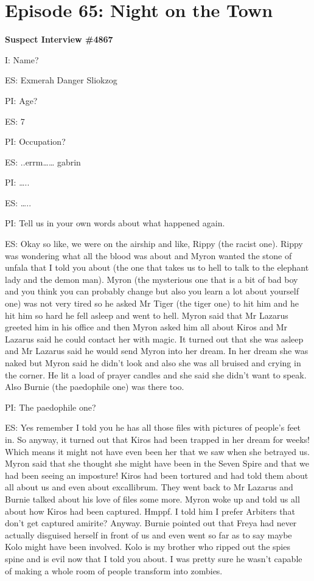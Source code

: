 \section{Episode 65: Night on the Town}

\medskip

\textbf{Suspect Interview \#4867}\medskip

I: Name?\medskip

ES: Exmerah Danger Sliokzog\medskip

PI: Age?\medskip

ES: 7\medskip

PI: Occupation?\medskip

ES: ..errm…… gabrin\medskip

PI: …..\medskip

ES: …..\medskip

PI: Tell us in your own words about what happened again.\medskip

ES: Okay so like, we were on the airship and like, Rippy (the racist one). Rippy was wondering what all the blood was about and Myron wanted the stone of unfala that I told you about (the one that takes us to hell to talk to the elephant lady and the demon man). Myron (the mysterious one that is a bit of bad boy and you think you can probably change but also you learn a lot about yourself one) was not very tired so he asked Mr Tiger (the tiger one) to hit him and he hit him so hard he fell asleep and went to hell. Myron said that Mr Lazarus greeted him in his office and then Myron asked him all about Kiros and Mr Lazarus said he could contact her with magic. It turned out that she was asleep and Mr Lazarus said he would send Myron into her dream. In her dream she was naked but Myron said he didn’t look and also she was all bruised and crying in the corner. He lit a load of prayer candles and she said she didn’t want to speak. Also Burnie (the paedophile one) was there too.\medskip

PI: The paedophile one?\medskip

ES: Yes remember I told you he has all those files with pictures of people’s feet in. So anyway, it turned out that Kiros had been trapped in her dream for weeks! Which means it might not have even been her that we saw when she betrayed us. Myron said that she thought she might have been in the Seven Spire and that we had been seeing an imposture! Kiros had been tortured and had told them about all about us and even about excallibrum. They went back to Mr Lazarus and Burnie talked about his love of files some more. Myron woke up and told us all about how Kiros had been captured. Hmppf. I told him I prefer Arbiters that don’t get captured amirite? Anyway. Burnie pointed out that Freya had never actually disguised herself in front of us and even went so far as to say maybe Kolo might have been involved. Kolo is my brother who ripped out the spies spine and is evil now that I told you about. I was pretty sure he wasn’t capable of making a whole room of people transform into zombies.\medskip

